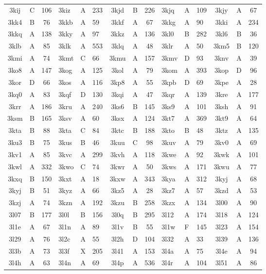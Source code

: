 \begin{longtable}{|c|c|c| a|a|a| c|c|c| a|a|a| c|c|c|}
3kij & C & 106 & 3kiz & A & 233 & 3kjd & B & 226 & 3kjq & A & 109 & 3kjy & A & 67\\
3kk4 & B & 76 & 3kkb & A & 59 & 3kkf & A & 67 & 3kkg & A & 90 & 3kki & A & 234\\
3kkq & A & 138 & 3kky & A & 97 & 3kkz & A & 136 & 3kl0 & B & 282 & 3kl6 & B & 36\\
3klb & A & 85 & 3klk & A & 553 & 3klq & A & 48 & 3klr & A & 50 & 3km5 & B & 120\\
3kmi & A & 74 & 3kmt & C & 66 & 3kmu & A & 157 & 3kmv & D & 93 & 3knv & A & 39\\
3ko8 & A & 147 & 3kog & A & 125 & 3kol & A & 79 & 3kom & A & 393 & 3kop & D & 96\\
3kor & D & 66 & 3kos & A & 116 & 3kp8 & A & 55 & 3kpb & D & 69 & 3kpe & A & 28\\
3kq0 & A & 83 & 3kqf & D & 130 & 3kqi & A & 47 & 3kqr & A & 139 & 3kre & A & 177\\
3krr & A & 186 & 3kru & A & 240 & 3ks6 & B & 145 & 3ks9 & A & 101 & 3ksh & A & 91\\
3ksm & B & 165 & 3ksv & A & 60 & 3ksx & A & 124 & 3kt7 & A & 369 & 3kt9 & A & 64\\
3kta & B & 88 & 3kta & C & 84 & 3ktc & B & 188 & 3kto & B & 48 & 3ktz & A & 135\\
3ku3 & B & 75 & 3kus & B & 46 & 3kuu & C & 98 & 3kuv & A & 79 & 3kv0 & A & 69\\
3kv1 & A & 85 & 3kvc & A & 299 & 3kvh & A & 118 & 3kwe & A & 92 & 3kwk & A & 101\\
3kwl & A & 332 & 3kwo & C & 74 & 3kwr & A & 50 & 3kws & A & 171 & 3kwu & A & 77\\
3kxq & B & 150 & 3kxt & A & 18 & 3kxw & A & 343 & 3kya & A & 312 & 3kyj & A & 68\\
3kyj & B & 51 & 3kyz & A & 66 & 3kz5 & A & 28 & 3kz7 & A & 57 & 3kzd & A & 53\\
3kzj & A & 74 & 3kzn & A & 192 & 3kzu & B & 258 & 3kzx & A & 134 & 3l00 & A & 90\\
3l07 & B & 177 & 3l0l & B & 156 & 3l0q & B & 295 & 3l12 & A & 174 & 3l18 & A & 124\\
3l1e & A & 67 & 3l1n & A & 89 & 3l1v & B & 55 & 3l1w & F & 145 & 3l23 & A & 154\\
3l29 & A & 76 & 3l2c & A & 55 & 3l2h & D & 104 & 3l32 & A & 33 & 3l39 & A & 136\\
3l3b & A & 73 & 3l3f & X & 205 & 3l41 & A & 153 & 3l4a & A & 75 & 3l4e & A & 94\\
3l4h & A & 63 & 3l4n & A & 69 & 3l4p & A & 536 & 3l4r & A & 104 & 3l51 & A & 86\\

\end{longtable}

